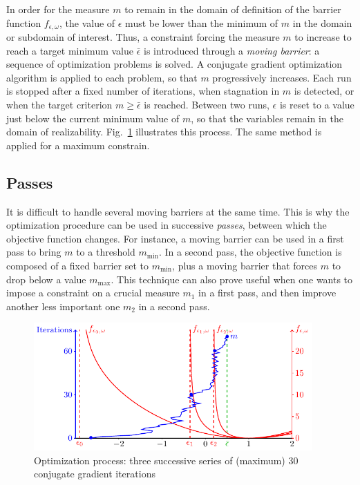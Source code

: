\documentclass[12pt,a4paper,a4wide]{article}
\begin{document}
In order for the measure $m$ to remain in the domain of definition of
the barrier function $f_{\epsilon,\omega}$, the value of $\epsilon$ must
be lower than the minimum of $m$ in the domain or subdomain of interest.
Thus, a constraint forcing the measure $m$ to increase to reach a target
minimum value $\bar{\epsilon}$ is introduced through a \emph{moving
barrier}: a sequence of optimization problems is solved. A conjugate
gradient optimization algorithm is applied to each problem, so that $m$
progressively increases. Each run is stopped after a fixed number of
iterations, when stagnation in $m$ is detected, or when the target
criterion $m\geq\bar{\epsilon}$ is reached. Between two runs, $\epsilon$
is reset to a value just below the current minimum value of $m$, so that
the variables remain in the domain of realizability.
Fig.~\ref{fig:opti_process} illustrates this process. The same method
is applied for a maximum constrain.


\subsection{Passes}

It is difficult to handle several moving barriers at the same
time. This is why the optimization procedure can be
used in successive \emph{passes}, between which the objective function
changes. For instance, a moving barrier can be used in a first pass to
bring $m$ to a threshold $m_{\min}$. In a second pass, the objective
function is composed of a fixed barrier set to $m_{\min}$, plus a moving
barrier that forces $m$ to drop below a value $m_{\max}$. This technique
can also prove useful when one wants to impose a constraint on a crucial
measure $m_1$ in a first pass, and then improve another less important
one $m_2$ in a second pass. 

\begin{figure}
\centering
\includegraphics[width=0.95\textwidth]{opti_process/opti_process}
\caption{Optimization process: three successive series of
(maximum) 30 conjugate gradient iterations\label{fig:opti_process}} 
\end{figure}
\end{document}
